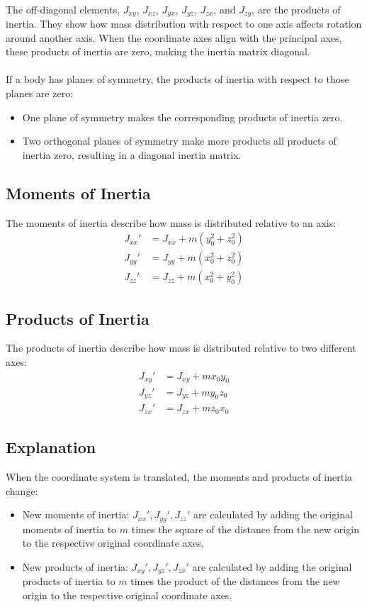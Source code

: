 \\
The off-diagonal elements, \( J_{xy} \), \( J_{xz} \), \( J_{yx} \), \( J_{yz} \), \( J_{zx} \), and \( J_{zy} \), are the products of inertia. They show how mass distribution with respect to one axis affects rotation around another axis. When the coordinate axes align with the principal axes, these products of inertia are zero, making the inertia matrix diagonal.
\\
\\
If a body has planes of symmetry, the products of inertia with respect to those planes are zero:
\begin{itemize}
    \item One plane of symmetry makes the corresponding products of inertia zero.
    \item Two orthogonal planes of symmetry make more products all products of inertia zero, resulting in a diagonal inertia matrix.
\end{itemize}


\subsection{Moments of Inertia}
The moments of inertia describe how mass is distributed relative to an axis:
\begin{align*}
    J_{xx}' &= J_{xx} + m (y_0^2 + z_0^2) \\
    J_{yy}' &= J_{yy} + m (x_0^2 + z_0^2) \\
    J_{zz}' &= J_{zz} + m (x_0^2 + y_0^2)
\end{align*}

\subsection{Products of Inertia}
The products of inertia describe how mass is distributed relative to two different axes:
\begin{align*}
    J_{xy}' &= J_{xy} + m x_0 y_0 \\
    J_{yz}' &= J_{yz} + m y_0 z_0 \\
    J_{zx}' &= J_{zx} + m z_0 x_0
\end{align*}

\subsection{Explanation}
When the coordinate system is translated, the moments and products of inertia change:
\begin{itemize}
    \item New moments of inertia: \( J_{xx}', J_{yy}', J_{zz}' \) are calculated by adding the original moments of inertia to \( m \) times the square of the distance from the new origin to the respective original coordinate axes.
    \item New products of inertia: \( J_{xy}', J_{yz}', J_{zx}' \) are calculated by adding the original products of inertia to \( m \) times the product of the distances from the new origin to the respective original coordinate axes.
\end{itemize}



